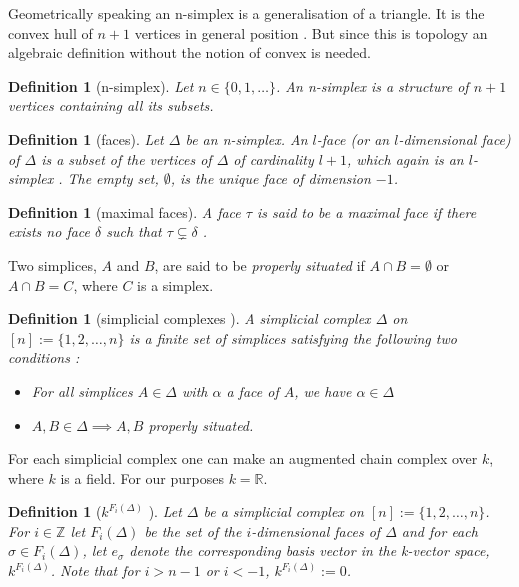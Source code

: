\documentclass[11pt,a4paper,twoside]{report}
\newtheorem{mydef}[mythm]{Definition}
\begin{document}
Geometrically speaking an n-simplex is a generalisation of a triangle. It is the convex hull of $n+1$ vertices in general position \cite{Nadathur}. But since this is topology an algebraic definition without the notion of convex is needed.

\begin{mydef}[n-simplex]
Let $n\in\{0,1,\dots\}$. An n-simplex is a structure of $n+1$ vertices containing all its subsets.
\end{mydef}

\begin{mydef}[faces]
Let $\Delta$ be an n-simplex. An $l$-face (or an $l$-dimensional face) of $\Delta$ is a subset of the vertices of $\Delta$ of cardinality $l+1$, which again is an $l$-simplex \cite{Nadathur}. The empty set, $\emptyset$, is the unique face of dimension $-1$\cite{Allgaier}.
\end{mydef}

\begin{mydef}[maximal faces]
A face $\tau$ is said to be a maximal face if there exists no face $\delta$ such that $\tau \subsetneq \delta$ \cite[p.15]{Jonsson}.
\end{mydef}

Two simplices, $A$ and $B$, are said to be \textit{properly situated} if $A\cap B=\emptyset$ or $A\cap B = C$, where $C$ is a simplex.\cite{Nadathur}

\begin{mydef}[simplicial complexes \cite{Nadathur}]
A simplicial complex $\Delta$ on $[n] := \{1,2,\dots ,n\}$ is a finite set of simplices satisfying the following two conditions :
\begin{itemize}
\item For all simplices $A\in\Delta$ with $\alpha$ a face of $A$, we have $\alpha\in\Delta$
\item $A,B\in\Delta\implies A, B $ properly situated.
\end{itemize}
\end{mydef}

For each simplicial complex one can make an augmented chain complex over $k$, where $k$ is a field. For our purposes $k=\mathbb{R}$.

\begin{mydef}[$k^{F_i(\Delta)}$ \cite{Allgaier}]
Let $\Delta$ be a simplicial complex on $[n] := \{1,2,\dots ,n\}$. For $i\in \mathbb{Z}$ let $F_i(\Delta)$ be the set of the $i$-dimensional faces of $\Delta$ and for each $\sigma\in F_i(\Delta)$, let $e_{\sigma}$ denote the corresponding basis vector in the k-vector space, $k^{F_i(\Delta)}$. Note that for $i>n-1$ or $i<-1$, $k^{F_i(\Delta)}:=0$.
\end{mydef}
\end{document}
